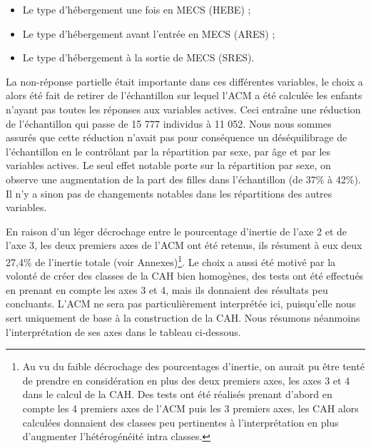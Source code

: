 \documentclass[
  12,
  a4paper,
]{report}
\providecommand{\tightlist}{%
  \setlength{\itemsep}{0pt}\setlength{\parskip}{0pt}}
\begin{document}
\begin{itemize}
\tightlist
\item
  Le type d'hébergement une fois en MECS (HEBE) ;
\item
  Le type d'hébergement avant l'entrée en MECS (ARES) ;
\item
  Le type d'hébergement à la sortie de MECS (SRES).
\end{itemize}

La non-réponse partielle était importante dans ces différentes
variables, le choix a alors été fait de retirer de l'échantillon sur
lequel l'ACM a été calculée les enfants n'ayant pas toutes les réponses
aux variables actives. Ceci entraîne une réduction de l'échantillon qui
passe de 15 777 individus à 11 052. Nous nous sommes assurés que cette
réduction n'avait pas pour conséquence un déséquilibrage de
l'échantillon en le contrôlant par la répartition par sexe, par âge et
par les variables actives. Le seul effet notable porte sur la
répartition par sexe, on observe une augmentation de la part des filles
dans l'échantillon (de 37\% à 42\%). Il n'y a sinon pas de changements
notables dans les répartitions des autres variables.

En raison d'un léger décrochage entre le pourcentage d'inertie de l'axe
2 et de l'axe 3, les deux premiers axes de l'ACM ont été retenus, ils
résument à eux deux 27,4\% de l'inertie totale (voir
Annexes)\footnote{Au vu du faible décrochage des pourcentages d'inertie,
  on aurait pu être tenté de prendre en considération en plus des deux
  premiers axes, les axes 3 et 4 dans le calcul de la CAH. Des tests ont
  été réalisés prenant d'abord en compte les 4 premiers axes de l'ACM
  puis les 3 premiers axes, les CAH alors calculées donnaient des
  classes peu pertinentes à l'interprétation en plus d'augmenter
  l'hétérogénéité intra classes.}. Le choix a aussi été motivé par la
volonté de créer des classes de la CAH bien homogènes, des tests ont été
effectués en prenant en compte les axes 3 et 4, mais ils donnaient des
résultats peu concluants. L'ACM ne sera pas particulièrement interprétée
ici, puisqu'elle nous sert uniquement de base à la construction de la
CAH. Nous résumons néanmoins l'interprétation de ses axes dans le
tableau ci-dessous.
\end{document}
